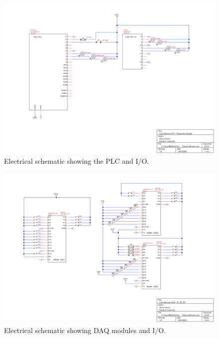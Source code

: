 \begin{figure}[H]
    \centering
    \includegraphics[width = 1\textwidth]{2_images/ElectricalDrawns01}
    \caption{Electrical schematic showing the PLC and I/O.}
    \label{fig:ElectricalDrawns01}
\end{figure} 

\begin{figure}[H]
    \centering
    \includegraphics[width = 1\textwidth]{2_images/ElectricalDrawns02}
    \caption{Electrical schematic showing DAQ modules and I/O.}
    \label{fig:ElectricalDrawns02}
\end{figure} 